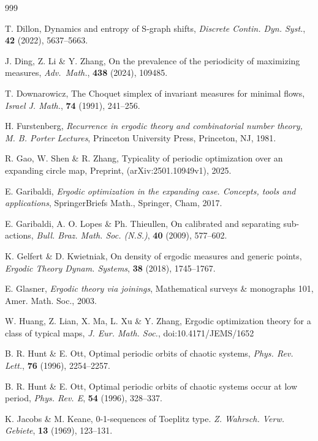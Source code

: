 \documentclass[reqno,11pt]{amsart}
\theoremstyle{definition}
\theoremstyle{remark}
\theoremstyle{remark}
\numberwithin{equation}{section}
\begin{document}
\begin{thebibliography}{999}
 

 T. Dillon, 
Dynamics and entropy of S-graph shifts,
{\it Discrete Contin. Dyn. Syst.}, {\bf  42} (2022), 5637--5663.

        J. Ding, Z. Li \& Y. Zhang,
        On the prevalence of the periodicity of maximizing measures,
        \textit{Adv.\ Math.},  {\bf 438} (2024), 109485.

T. Downarowicz,
The Choquet simplex of invariant measures for minimal flows,
{\it Israel J. Math.}, {\bf 74} (1991), 241--256.


H. Furstenberg, {\it Recurrence in ergodic theory and combinatorial number theory,
 M. B. Porter Lectures}, Princeton University Press, Princeton, NJ, 1981.


 R. Gao, W. Shen \& R. Zhang,
Typicality of periodic optimization over an expanding circle map,
Preprint, (arXiv:2501.10949v1), 2025.

 E. Garibaldi,
{\it Ergodic optimization in the expanding case.
Concepts, tools and applications},
SpringerBriefs Math.,
Springer, Cham, 2017.

		E. Garibaldi, A. O. Lopes \& Ph. Thieullen,
		On calibrated and separating sub-actions,
		\textit{Bull. Braz. Math. Soc. (N.S.)}, {\bf 40} (2009), 577--602.

   K. Gelfert \& D. Kwietniak, On density of ergodic measures and
generic points, 
\textit{Ergodic Theory Dynam. Systems},
{\bf 38} (2018),  1745--1767.


 E. Glasner, {\it Ergodic theory via joinings},
  Mathematical surveys \& monographs 101, Amer. Math. Soc., 2003.



	W. Huang, Z. Lian, X. Ma, L. Xu \& Y. Zhang, Ergodic optimization theory for a class of typical maps,
	{\it J. Eur. Math. Soc.}, doi:10.4171/JEMS/1652

	B. R. Hunt \& E. Ott, Optimal periodic orbits of chaotic systems,
{\it Phys. Rev. Lett.}, {\bf 76} (1996), 2254--2257.
	
	B. R. Hunt \& E. Ott, Optimal periodic orbits of chaotic systems occur at low period,
	{\it Phys. Rev. E}, {\bf  54} (1996), 328--337.
		
	
	



K. Jacobs \& M. Keane, 
0-1-sequences of Toeplitz type.
{\it Z. Wahrsch. Verw. Gebiete},  {\bf 13} (1969), 123--131.




\end{thebibliography}
\end{document}
